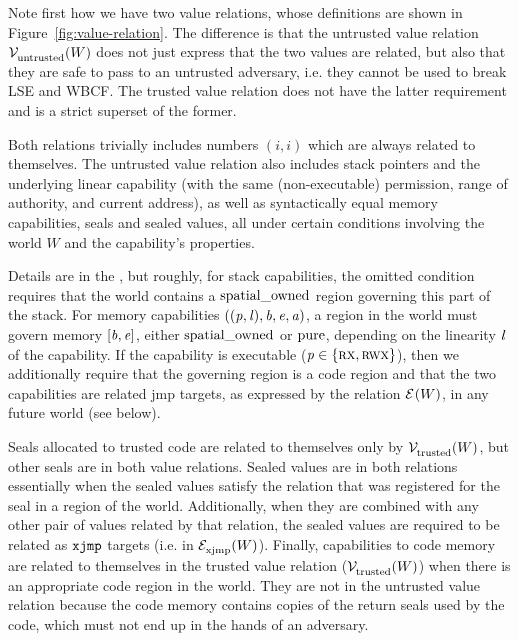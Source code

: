 \documentclass[acmsmall,review,showframe]{acmart}\settopmatter{printfolios=true,printccs=false,printacmref=false}
\renewcommand{\perm}{\var{p}}
\renewcommand{\lre}[1][]{\typesetlr{E}^{#1}}
\renewcommand{\lrexj}[1][]{\typesetlr{E}^{#1}_{\mathrm{xjmp}}}
\renewcommand{\lrvg}[2][]{\typesetlr{V}^{#1}_{#2}}
\renewcommand{\lrv}[1][]{\lrvg[#1]{\untrusted}}
\renewcommand{\lrvtrusted}[1][]{\lrvg[#1]{\trusted}}
\begin{document}
Note first how we have two value relations, whose definitions are shown in Figure~\ref{fig:value-relation}.
The difference is that the untrusted value relation $\lrv(W)$ does not just express that the two values are related, but also that they are safe to pass to an untrusted adversary, i.e. they cannot be used to break LSE and WBCF.
The trusted value relation does not have the latter requirement and is a strict superset of the former.

Both relations trivially includes numbers $(i,i)$ which are always related to themselves.
The untrusted value relation also includes stack pointers and the underlying linear capability (with the same (non-executable) permission, range of authority, and current address), as well as syntactically equal memory capabilities, seals and sealed values, all under certain conditions involving the world $W$ and the capability's properties.

Details are in the \cite{technical_report}, but roughly, for stack capabilities, the omitted condition requires that the world contains a $\mathrm{spatial\_owned}$ region governing this part of the stack.
For memory capabilities $((\perm,\lin),\baddr,\eaddr,\aaddr)$, a region in the world must govern memory $[\mathit{b},\mathit{e}]$, either $\mathrm{spatial\_owned}$ or $\mathrm{pure}$, depending on the linearity $\mathit{l}$ of the capability.
If the capability is executable ($\perm \in \{\rx,\rwx\}$), then we additionally require that the governing region is a code region and that the two capabilities are related $\mathrm{jmp}$ targets, as expressed by the relation $\lre(W)$, in any future world (see below).

Seals allocated to trusted code are related to themselves only by $\lrvtrusted(W)$, but other seals are in both value relations.
Sealed values are in both relations essentially when the sealed values satisfy the relation that was registered for the seal in a region of the world.
Additionally, when they are combined with any other pair of values related by that relation, the sealed values are required to be related as $\txjmp{}{}$ targets (i.e. in $\lrexj(W)$).
Finally, capabilities to code memory are related to themselves in the trusted value relation ($\lrvtrusted(W)$) when there is an appropriate code region in the world.
They are not in the untrusted value relation because the code memory contains copies of the return seals used by the code, which must not end up in the hands of an adversary.
\end{document}
